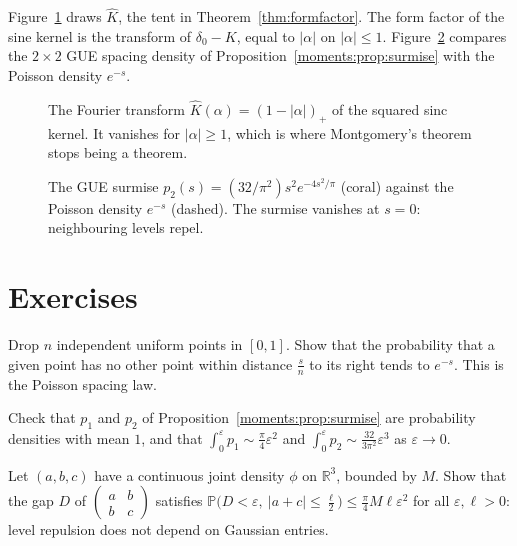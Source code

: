 Figure~\ref{fig:v15c09-tent} draws \(\hat K\), the tent in Theorem~\ref{thm:formfactor}. The form factor of the sine kernel is the transform of \(\delta_0-K\), equal to \(|\alpha|\) on \(|\alpha|\le1\). Figure~\ref{fig:v15c09-surmise} compares the \(2\times2\) GUE spacing density of Proposition~\ref{moments:prop:surmise} with the Poisson density \(e^{-s}\).

\begin{figure}[ht]
\centering
{}
\caption{The Fourier transform \(\hat K(\alpha)=(1-|\alpha|)_+\) of the squared sinc kernel. It vanishes for \(|\alpha|\ge1\), which is where Montgomery's theorem stops being a theorem.}
\label{fig:v15c09-tent}
\end{figure}

\begin{figure}[ht]
\centering
{}
\caption{The GUE surmise \(p_2(s)=(32/\pi^2)s^2e^{-4s^2/\pi}\) (coral) against the Poisson density \(e^{-s}\) (dashed). The surmise vanishes at \(s=0\): neighbouring levels repel.}
\label{fig:v15c09-surmise}
\end{figure}

\section{Exercises}



\begin{exercise}[$\star$]\label{moments:ex:poissonsp}
Drop $n$ independent uniform points in $[0,1]$. Show that the probability that a given point has no other point within distance $\frac sn$ to its right
tends to $e^{-s}$. This is the Poisson spacing law.
\end{exercise}

\begin{exercise}[$\star$]\label{moments:ex:surmisemean}
Check that $p_1$ and $p_2$ of Proposition~\ref{moments:prop:surmise} are probability densities with mean $1$, and that $\int_0^\varepsilon p_1\sim\frac\pi4\varepsilon^2$ and
$\int_0^\varepsilon p_2\sim\frac{32}{3\pi^2}\varepsilon^3$ as $\varepsilon\to0$.
\end{exercise}

\begin{exercise}[$\star\star$]\label{moments:ex:repulsion}
Let $(a,b,c)$ have a continuous joint density $\phi$ on $\mathbb R^3$, bounded by $M$. Show that the gap $D$ of $\begin{pmatrix}a&b\\b&c\end{pmatrix}$
satisfies $\mathbb P\bigl(D<\varepsilon,\ |a+c|\le\frac\ell2\bigr)\le\frac\pi4M\ell\varepsilon^2$ for all $\varepsilon,\ell>0$: level repulsion does not depend
on Gaussian entries.
\end{exercise}

